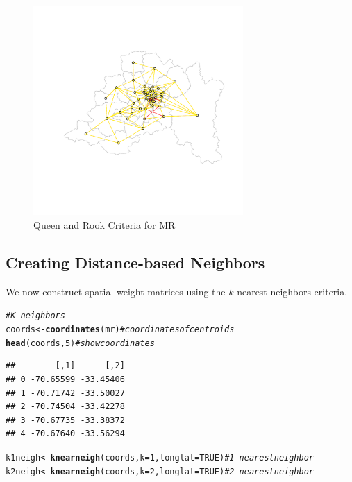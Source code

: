 \documentclass[english,12pt]{book}\usepackage[]{graphicx}\usepackage[]{xcolor}
\makeatletter
\newcommand{\hlnum}[1]{\textcolor[rgb]{0.686,0.059,0.569}{#1}}%
\newcommand{\hlcom}[1]{\textcolor[rgb]{0.678,0.584,0.686}{\textit{#1}}}%
\newcommand{\hlstd}[1]{\textcolor[rgb]{0.345,0.345,0.345}{#1}}%
\newcommand{\hlkwb}[1]{\textcolor[rgb]{0.69,0.353,0.396}{#1}}%
\newcommand{\hlkwc}[1]{\textcolor[rgb]{0.333,0.667,0.333}{#1}}%
\newcommand{\hlkwd}[1]{\textcolor[rgb]{0.737,0.353,0.396}{\textbf{#1}}}%
\newenvironment{kframe}{%
 \def\at@end@of@kframe{}%
 \ifinner\ifhmode%
  \def\at@end@of@kframe{\end{minipage}}%
  \begin{minipage}{\columnwidth}%
 \fi\fi%
 \def\FrameCommand##1{\hskip\@totalleftmargin \hskip-\fboxsep
 \colorbox{shadecolor}{##1}\hskip-\fboxsep
     \hskip-\linewidth \hskip-\@totalleftmargin \hskip\columnwidth}%
 \MakeFramed {\advance\hsize-\width
   \@totalleftmargin\z@ \linewidth\hsize
   \@setminipage}}%
 {\par\unskip\endMakeFramed%
 \at@end@of@kframe}
\newenvironment{knitrout}{}{} %
\makeatother
\begin{document}
\begin{figure}
  \caption{Queen and Rook Criteria for MR}
    \label{fig:Queen-Rook}
\begin{knitrout}
\color{fgcolor}

{\centering \includegraphics[width=8cm,height=8cm]{figure/plot-queen-rookT-1} 

}


\end{knitrout}
\end{figure}

\subsection{Creating Distance-based Neighbors}

We now construct spatial weight matrices using the $k$-nearest neighbors criteria. 

\begin{knitrout}
\color{fgcolor}\begin{kframe}
\begin{alltt}
\hlcom{# K-neighbors}
\hlstd{coords} \hlkwb{<-} \hlkwd{coordinates}\hlstd{(mr)}                             \hlcom{# coordinates of centroids}
\hlkwd{head}\hlstd{(coords,} \hlnum{5}\hlstd{)}                                       \hlcom{# show coordinates}
\end{alltt}
\begin{verbatim}
##        [,1]      [,2]
## 0 -70.65599 -33.45406
## 1 -70.71742 -33.50027
## 2 -70.74504 -33.42278
## 3 -70.67735 -33.38372
## 4 -70.67640 -33.56294
\end{verbatim}
\begin{alltt}
\hlstd{k1neigh} \hlkwb{<-} \hlkwd{knearneigh}\hlstd{(coords,} \hlkwc{k} \hlstd{=} \hlnum{1}\hlstd{,} \hlkwc{longlat} \hlstd{=} \hlnum{TRUE}\hlstd{)}  \hlcom{# 1-nearest neighbor}
\hlstd{k2neigh} \hlkwb{<-} \hlkwd{knearneigh}\hlstd{(coords,} \hlkwc{k} \hlstd{=} \hlnum{2}\hlstd{,} \hlkwc{longlat} \hlstd{=} \hlnum{TRUE}\hlstd{)}  \hlcom{# 2-nearest neighbor}
\end{alltt}
\end{kframe}
\end{knitrout}
\end{document}
